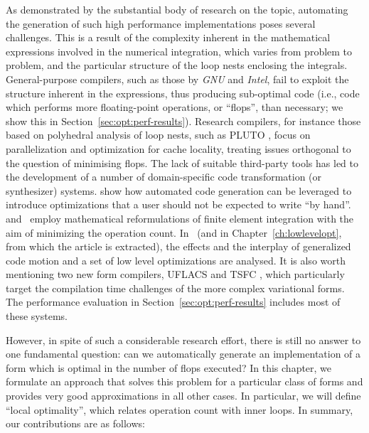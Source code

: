 As demonstrated by the substantial body of research on the topic, automating the generation of such high performance implementations poses several challenges. This is a result of the complexity inherent in the mathematical expressions involved in the numerical integration, which varies from problem to problem, and the particular structure of the loop nests enclosing the integrals. General-purpose compilers, such as those by \emph{GNU} and \emph{Intel}, fail to exploit the structure inherent in the expressions, thus producing sub-optimal code (i.e., code which performs more floating-point operations, or ``flops'', than necessary; we show this in Section~\ref{sec:opt:perf-results}). Research compilers, for instance those based on polyhedral analysis of loop nests, such as PLUTO \citep{pluto}, focus on parallelization and optimization for cache locality, treating issues orthogonal to the question of minimising flops. The lack of suitable third-party tools has led to the development of a number of domain-specific code transformation (or synthesizer) systems. \cite{quadrature-olegaard} show how automated code generation can be leveraged to introduce optimizations that a user should not be expected to write ``by hand''. \cite{FFC-TC} and~\cite{Francis} employ mathematical reformulations of finite element integration with the aim of minimizing the operation count. In~\cite{Luporini-coffee} (and in Chapter~\ref{ch:lowlevelopt}, from which the article is extracted), the effects and the interplay of generalized code motion and a set of low level optimizations are analysed. It is also worth mentioning two new form compilers, UFLACS \citep{Uflacs} and TSFC \citep{TSFC}, which particularly target the compilation time challenges of the more complex variational forms. The performance evaluation in Section~\ref{sec:opt:perf-results} includes most of these systems.

However, in spite of such a considerable research effort, there is still no answer to one fundamental question: can we automatically generate an implementation of a form which is optimal in the number of flops executed? In this chapter, we formulate an approach that solves this problem for a particular class of forms and provides very good approximations in all other cases. In particular, we will define ``local optimality'', which relates operation count with inner loops. In summary, our contributions are as follows:

